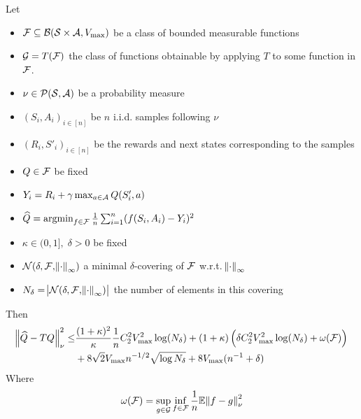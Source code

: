 
\begin{thm}\label{thm:oneStep}
  Let
  \begin{itemize}
    \item $\mathcal{F} \subseteq \mathcal{B}(\mathcal{S}\times\mathcal{A}, V_{\max})$
      be a class of bounded measurable functions
    \item $\mathcal{G} = T(\mathcal{F})$ the class of functions obtainable by
      applying $T$ to some function in $\mathcal{F}$.
    \item $\nu \in \mathcal{P}(\mathcal{S},\mathcal{A})$ be a probability measure
    \item $(S_i, A_i)_{i\in[n]}$ be $n$ i.i.d. samples following $\nu$
    \item $(R_i, S'_i)_{i\in[n]}$ be the rewards and next states
    	corresponding to the samples
    \item $Q \in \mathcal{F}$ be fixed
    \item $Y_i = R_i + \gamma \max_{a \in \mathcal{A}} Q(S'_i, a)$
    \item $\widehat{Q} = \operatorname*{argmin}_{f \in \mathcal{F}} \frac{1}{n}
      \sum_{i=1}^n (f(S_i, A_i) - Y_i)^2$
    \item $\kappa \in (0,1],\; \delta > 0$ be fixed
    \item $\mathcal{N}(\delta, \mathcal{F}, \norm{\cdot}_\infty)$
      a minimal $\delta$-covering of $\mathcal{F}$ w.r.t. $\norm{\cdot}_\infty$
    \item $N_\delta = \abs{\mathcal{N}(\delta, \mathcal{F}, \norm{\cdot}_\infty)}$
      the number of elements in this covering
  \end{itemize}
  Then
  \begin{align*}
    \norm{\widehat{Q} - TQ}_\nu^2
    \leq & \frac{(1+\kappa)^2}{\kappa} \frac{1}{n} C_2^2 V_{\max}^2 \log(N_\delta)
    + (1 + \kappa) \left( \delta C_2^2 V_{\max}^2 \log(N_\delta)
    + \omega(\mathcal{F}) \right) 
    \notag
    \\ & + 8 \sqrt{2} V_{\max} n^{-1/2} \sqrt{\log N_\delta}
    + 8 V_{\max} (n^{-1} + \delta)
  \end{align*}
  Where
  \begin{equation*}
    \omega(\mathcal{F}) = \sup_{g \in \mathcal{G}} \inf_{f \in \mathcal{F}}
    \frac{1}{n} \mathbb{E} \norm{f - g}_\nu^2
    \label{eq:defomega}
  \end{equation*}
\end{thm}
